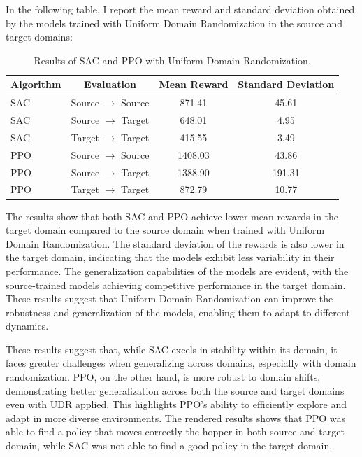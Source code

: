 \documentclass[12pt]{article}
\begin{document}
In the following table, I report the mean reward and standard deviation obtained by the models trained with Uniform Domain Randomization in the source and target domains:

\begin{table}[H]
    \centering
    \begin{tabular}{|l|c|c|c|}
        \hline
        \textbf{Algorithm} & \textbf{Evaluation} & \textbf{Mean Reward} & \textbf{Standard Deviation} \\ \hline
        SAC & Source $\rightarrow$ Source & 871.41 & 45.61 \\ 
        SAC & Source $\rightarrow$ Target & 648.01 & 4.95 \\ 
        SAC & Target $\rightarrow$ Target & 415.55 & 3.49 \\ \hline
        PPO & Source $\rightarrow$ Source & 1408.03 & 43.86 \\ 
        PPO & Source $\rightarrow$ Target & 1388.90 & 191.31 \\ 
        PPO & Target $\rightarrow$ Target & 872.79 & 10.77 \\ \hline
    \end{tabular}
    \caption{Results of SAC and PPO with Uniform Domain Randomization.}
    \label{tab:results_udr}
\end{table}

The results show that both SAC and PPO achieve lower mean rewards in the target domain compared to the source domain when trained with Uniform Domain Randomization. The standard deviation of the rewards is also lower in the target domain, indicating that the models exhibit less variability in their performance. The generalization capabilities of the models are evident, with the source-trained models achieving competitive performance in the target domain. These results suggest that Uniform Domain Randomization can improve the robustness and generalization of the models, enabling them to adapt to different dynamics.

These results suggest that, while SAC excels in stability within its domain, it faces greater challenges when generalizing across domains, especially with domain randomization. PPO, on the other hand, is more robust to domain shifts, demonstrating better generalization across both the source and target domains even with UDR applied. This highlights PPO’s ability to efficiently explore and adapt in more diverse environments. The rendered results shows that PPO was able to find a policy that moves correctly the hopper in both source and target domain, while SAC was not able to find a good policy in the target domain.
\end{document}
